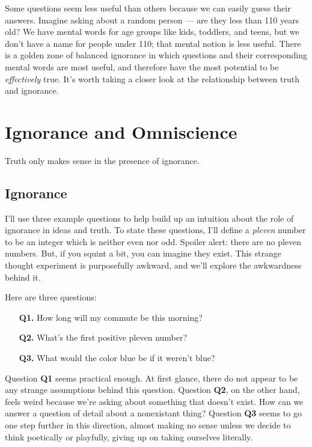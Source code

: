 \documentclass[11pt, oneside]{article}   	%
\begin{document}
Some questions seem less useful than others because we can easily guess their
answers. Imagine asking about a random person ---
are they less than 110 years old?
We have mental words for age groups like kids,
toddlers, and teens, but we don't have a name for people under 110;
that mental notion is less useful.
There is a golden zone of balanced ignorance in which questions and their
corresponding mental words are most useful, and therefore have
the most potential to be {\em effectively} true. It's worth taking a closer look
at the relationship between truth and ignorance.


%
%
%
%
%


\section{Ignorance and Omniscience}

Truth only makes sense in the presence of ignorance.

\subsection{Ignorance}

I'll use three example questions
to help build up an intuition about the role of
ignorance in ideas and truth.
To state these questions, I'll define a
{\em pleven} number to be an integer which is neither even nor odd. Spoiler
alert: there are no pleven numbers. But, if you squint a bit, you can imagine
they exist. This strange thought experiment is purposefully awkward, and we'll
explore the awkwardness behind it.

Here are three questions:
\begin{enumerate}
    \item[{\bf Q1.}] How long will my commute be this morning?
    \item[{\bf Q2.}] What's the first positive pleven number?
    \item[{\bf Q3.}] What would the color blue be if it weren't blue?
\end{enumerate}
Question {\bf Q1} seems practical enough. At first glance, there do not appear
to be any strange assumptions behind this question.
Question {\bf Q2}, on the other hand, feels weird because we're asking about
something that doesn't exist. How can we answer a question of detail about a
nonexistant thing? Question {\bf Q3} seems to go one step further in this
direction, almost making no sense unless we decide to think poetically or
playfully, giving up on taking ourselves literally.
\end{document}
